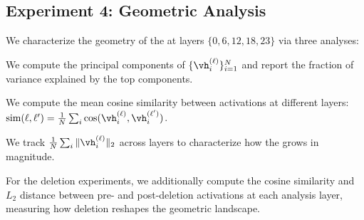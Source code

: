 \subsection{Experiment 4: Geometric Analysis}
\label{sec:exp4}

We characterize the geometry of the \residstream at layers $\{0, 6, 12, 18, 23\}$ via three analyses:

 We compute the principal components of $\{\vh^{(\ell)}_i\}_{i=1}^{N}$ and report the fraction of variance explained by the top components.

 We compute the mean cosine similarity between activations at different layers: $\text{sim}(\ell, \ell') = \frac{1}{N} \sum_i \cos(\vh^{(\ell)}_i, \vh^{(\ell')}_i)$.

 We track $\frac{1}{N}\sum_i \|\vh^{(\ell)}_i\|_2$ across layers to characterize how the \residstream grows in magnitude.

For the deletion experiments, we additionally compute the cosine similarity and $L_2$ distance between pre- and post-deletion activations at each analysis layer, measuring how deletion reshapes the geometric landscape.
